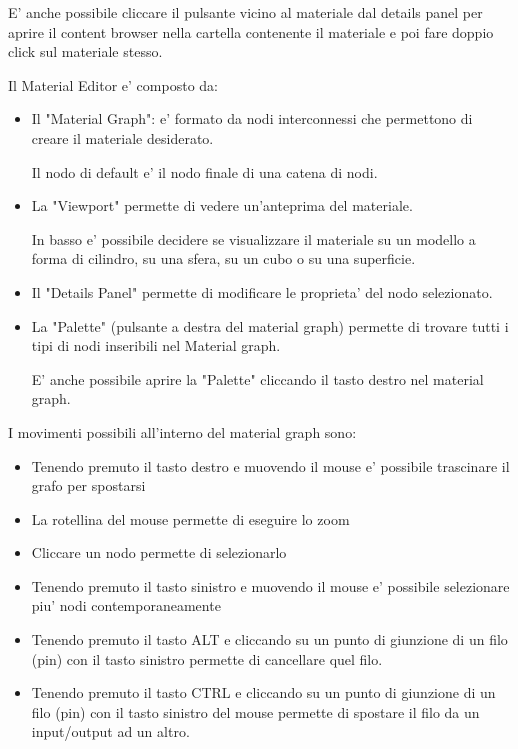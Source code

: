             \begin{notebox}
                E' anche possibile cliccare il pulsante vicino al materiale dal details panel per aprire il content browser nella cartella contenente il materiale e poi fare doppio click sul materiale stesso.
            \end{notebox}

            Il Material Editor e' composto da:
            \begin{itemize}
                \item Il "Material Graph": e' formato da nodi interconnessi che permettono di creare il materiale desiderato.

                    Il nodo di default e' il nodo finale di una catena di nodi.

                \item La "Viewport" permette di vedere un'anteprima del materiale.

                    In basso e' possibile decidere se visualizzare il materiale su un modello a forma di cilindro, su una sfera, su un cubo o su una superficie.

                \item Il "Details Panel" permette di modificare le proprieta' del nodo selezionato.

                \item La "Palette" (pulsante a destra del material graph) permette di trovare tutti i tipi di nodi inseribili nel Material graph.

                    \begin{notebox}
                        E' anche possibile aprire la "Palette" cliccando il tasto destro nel material graph.
                    \end{notebox}

            \end{itemize}

            I movimenti possibili all'interno del material graph sono:
            \begin{itemize}
                \item Tenendo premuto il tasto destro e muovendo il mouse e' possibile trascinare il grafo per spostarsi
                \item La rotellina del mouse permette di eseguire lo zoom
                \item Cliccare un nodo permette di selezionarlo
                \item Tenendo premuto il tasto sinistro e muovendo il mouse e' possibile selezionare piu' nodi contemporaneamente
                \item Tenendo premuto il tasto ALT e cliccando su un punto di giunzione di un filo (pin) con il tasto sinistro permette di cancellare quel filo.
                \item Tenendo premuto il tasto CTRL e cliccando su un punto di giunzione di un filo (pin) con il tasto sinistro del mouse permette di spostare il filo da un input/output ad un altro.
            \end{itemize}


